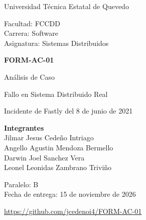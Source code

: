 \documentclass[12pt,a4paper]{article}
\begin{document}
\begin{center}
\vspace*{0.2cm}
{\Large Universidad Técnica Estatal de Quevedo\par}
\vspace{0.5cm}
Facultad: FCCDD\\
Carrera: Software\\
Asignatura: Sistemas Distribuidos

\vfill
{\LARGE\textbf{FORM-AC-01}\par}
\vspace{0.6cm}
{\Large Análisis de Caso\par}
\vspace{0.35cm}
{\Large Fallo en Sistema Distribuido Real\par}
\vspace{0.6cm}
{\large Incidente de Fastly del 8 de junio de 2021\par}
\vfill

\textbf{Integrantes}\\[0.25cm]
Jilmar Jesus Cedeño Intriago\\
Angello Agustin Mendoza Bermello\\
Darwin Joel Sanchez Vera\\
Leonel Leonidas Zambrano Triviño

\vspace{0.4cm}
Paralelo: B\\
Fecha de entrega: 15 de noviembre de 2026

\vspace{0.7cm}
\mbox{\url{https://github.com/jcedenoi4/FORM-AC-01}}
\vspace*{0.3cm}
\end{center}
\end{document}
